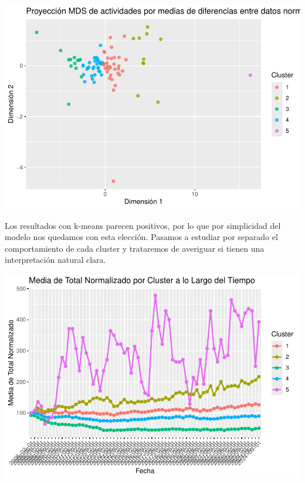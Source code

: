 \documentclass[notspecified,article,submit,moreauthors,pdftex]{Definitions/mdpi}
\begin{document}
\includegraphics{ProyectoAED2024_files/figure-latex/unnamed-chunk-46-1.pdf}

Los resultados con k-means parecen positivos, por lo que por simplicidad
del modelo nos quedamos con esta elección. Pasamos a estudiar por
separado el comportamiento de cada cluster y trataremos de averiguar si
tienen una interpretación natural clara.

\includegraphics{ProyectoAED2024_files/figure-latex/unnamed-chunk-47-1.pdf}
\end{document}

